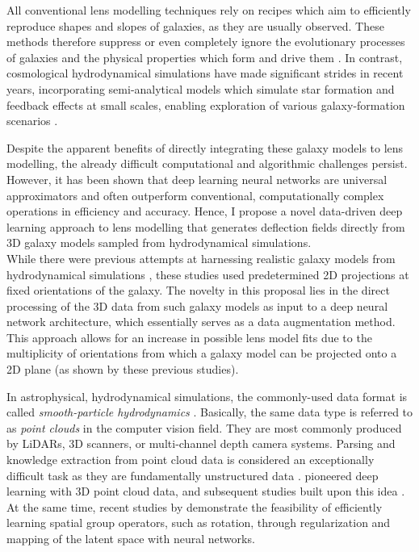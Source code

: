 \documentclass[a4paper,10pt]{article}
\begin{document}
All conventional lens modelling techniques rely on recipes which aim
to efficiently reproduce shapes and slopes of galaxies, as they are
usually observed. These methods therefore suppress or even completely
ignore the evolutionary processes of galaxies and the physical
properties which form and drive them \cite[cf.][]{Naab17}. In contrast,
cosmological hydrodynamical simulations have made significant strides
in recent years, incorporating semi-analytical models which simulate
star formation and feedback effects at small scales, enabling
exploration of various galaxy-formation scenarios
\citep[e.g.][]{Pillepich17,Weinberger16,Vogelsberger14}.

Despite the apparent benefits of directly integrating these galaxy
models to lens modelling, the already difficult computational and
algorithmic challenges persist. However, it has been shown that deep
learning neural networks are universal approximators
\citep{Hornik89,Kratsios20} and often outperform conventional,
computationally complex operations in efficiency and accuracy. Hence,
I propose a novel data-driven deep learning approach to lens modelling
that generates deflection fields directly from 3D galaxy models
sampled from hydrodynamical simulations. \\[0pt]
While there were previous attempts at harnessing realistic galaxy
models from hydrodynamical simulations \citep[see][]{Adam22,Denzel21},
these studies used predetermined 2D projections at fixed orientations
of the galaxy. The novelty in this proposal lies in the direct
processing of the 3D data from such galaxy models as input to a deep
neural network architecture, which essentially serves as a data
augmentation method. This approach allows for an increase in possible
lens model fits due to the multiplicity of orientations from which a
galaxy model can be projected onto a 2D plane (as shown by these
previous studies).

In astrophysical, hydrodynamical simulations, the commonly-used data
format is called \emph{smooth-particle hydrodynamics}
\citep{Gingold77,Lucy77,Monaghan92}. Basically, the same data
type is referred to as \emph{point clouds} in the computer vision
field. They are most commonly produced by LiDARs, 3D scanners, or
multi-channel depth camera systems. Parsing and knowledge extraction
from point cloud data is considered an exceptionally difficult task as
they are fundamentally unstructured data
\citep[cf.][]{Vinyals2015,Armeni16,Rufus20,Zhang15,Nuechter07,Rusinkiewicz00}.
\cite{Qi16} pioneered deep learning with 3D point cloud data, and
subsequent studies built upon this idea
\citep[see][]{Qi17,BenShabat17,Klokov17,Kaul21,AbadRocamora22}. \\[0pt]
At the same time, recent studies by \cite{Quessard20,Keurti22}
demonstrate the feasibility of efficiently learning spatial group
operators, such as rotation, through regularization and mapping of the
latent space with neural networks.
\end{document}
